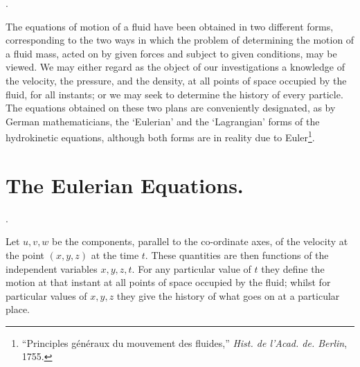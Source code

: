 \documentclass[twoside, openany]{book}
\newcounter{article}
\newcommand{\article}[1]{
  \stepcounter{article}
  \textbf{\thearticle}.
  \markright{#1} %
}
\numberwithin{equation}{article} %
\begin{document}
\article{a3}
The equations of motion of a fluid have been obtained in two different forms, corresponding to the two ways in which the problem of determining the motion of a fluid mass, acted on by given forces and subject to given conditions, may be viewed. We may either regard as the object of our investigations a knowledge of the velocity, the pressure, and the density, at all points of space occupied by the fluid, for all instants; or we may seek to determine the history of every particle. The equations obtained on these two plans are conveniently designated, as by German mathematicians, the `Eulerian' and the `Lagrangian' forms of the hydrokinetic equations, although both forms are in reality due to Euler\footnote{``Principles g\'en\'eraux du mouvement des fluides,'' \textit{Hist. de l'Acad. de. Berlin}, 1755.}.


\section*{The Eulerian Equations.}


\article{a4}
Let $u, v, w$ be the components, parallel to the co-ordinate axes, of the velocity at the point $(x, y, z)$ at the time $t$. These quantities are then functions of the independent variables $x, y, z, t$. For any particular value of $t$ they define the motion at that instant at all points of space occupied by the fluid; whilst for particular values of $x, y, z$ they give the history of what goes on at a particular place.
\end{document}
